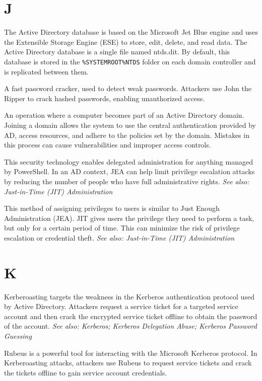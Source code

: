 \section*{J}
 The Active Directory database is based on the Microsoft Jet Blue engine and uses the Extensible Storage Engine (ESE) to store, edit, delete, and read data. The Active Directory database is a single file named ntds.dit. By default, this database is stored in the \texttt{\%SYSTEMROOT\%NTDS} folder on each domain controller and is replicated between them.

 A fast password cracker, used to detect weak passwords. Attackers use John the Ripper to crack hashed passwords, enabling unauthorized access.

 An operation where a computer becomes part of an Active Directory domain. Joining a domain allows the system to use the central authentication provided by AD, access resources, and adhere to the policies set by the domain. Mistakes in this process can cause vulnerabilities and improper access controls.

 This security technology enables delegated administration for anything managed by PowerShell. In an AD context, JEA can help limit privilege escalation attacks by reducing the number of people who have full administrative rights.
\textit{See also: Just-in-Time (JIT) Administration}

 This method of assigning privileges to users is similar to Just Enough Administration (JEA). JIT gives users the privilege they need to perform a task, but only for a certain period of time. This can minimize the risk of privilege escalation or credential theft.
\textit{See also: Just-in-Time (JIT) Administration}

\section*{K}
 Kerberoasting targets the weakness in the Kerberos authentication protocol used by Active Directory. Attackers request a service ticket for a targeted service account and then crack the encrypted service ticket offline to obtain the password of the account.
\textit{See also: Kerberos; Kerberos Delegation Abuse; Kerberos Password Guessing}

 Rubeus is a powerful tool for interacting with the Microsoft Kerberos protocol. In Kerberoasting attacks, attackers use Rubeus to request service tickets and crack the tickets offline to gain service account credentials.

